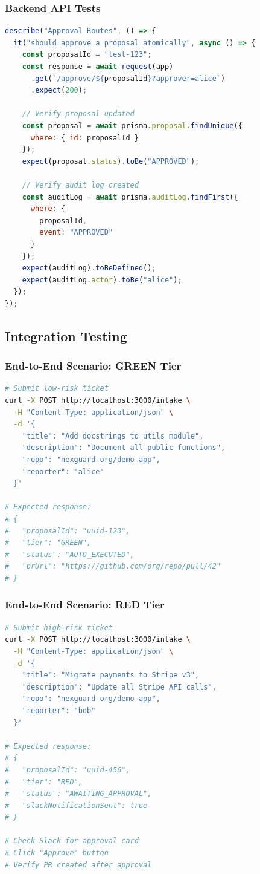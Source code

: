 \documentclass[11pt,a4paper]{article}
\begin{document}
\newpage
\subsubsection{Backend API Tests}
\begin{lstlisting}[language=JavaScript,caption=Approval Endpoint Test]
describe("Approval Routes", () => {
  it("should approve a proposal atomically", async () => {
    const proposalId = "test-123";
    const response = await request(app)
      .get(`/approve/${proposalId}?approver=alice`)
      .expect(200);
    
    // Verify proposal updated
    const proposal = await prisma.proposal.findUnique({
      where: { id: proposalId }
    });
    expect(proposal.status).toBe("APPROVED");
    
    // Verify audit log created
    const auditLog = await prisma.auditLog.findFirst({
      where: {
        proposalId,
        event: "APPROVED"
      }
    });
    expect(auditLog).toBeDefined();
    expect(auditLog.actor).toBe("alice");
  });
});
\end{lstlisting}

\subsection{Integration Testing}

\subsubsection{End-to-End Scenario: GREEN Tier}
\begin{lstlisting}[language=bash,caption=GREEN Tier Test]
# Submit low-risk ticket
curl -X POST http://localhost:3000/intake \
  -H "Content-Type: application/json" \
  -d '{
    "title": "Add docstrings to utils module",
    "description": "Document all public functions",
    "repo": "nexguard-org/demo-app",
    "reporter": "alice"
  }'

# Expected response:
# {
#   "proposalId": "uuid-123",
#   "tier": "GREEN",
#   "status": "AUTO_EXECUTED",
#   "prUrl": "https://github.com/org/repo/pull/42"
# }
\end{lstlisting}

\newpage
\subsubsection{End-to-End Scenario: RED Tier}
\begin{lstlisting}[language=bash,caption=RED Tier Test]
# Submit high-risk ticket
curl -X POST http://localhost:3000/intake \
  -H "Content-Type: application/json" \
  -d '{
    "title": "Migrate payments to Stripe v3",
    "description": "Update all Stripe API calls",
    "repo": "nexguard-org/demo-app",
    "reporter": "bob"
  }'

# Expected response:
# {
#   "proposalId": "uuid-456",
#   "tier": "RED",
#   "status": "AWAITING_APPROVAL",
#   "slackNotificationSent": true
# }

# Check Slack for approval card
# Click "Approve" button
# Verify PR created after approval
\end{lstlisting}
\end{document}

